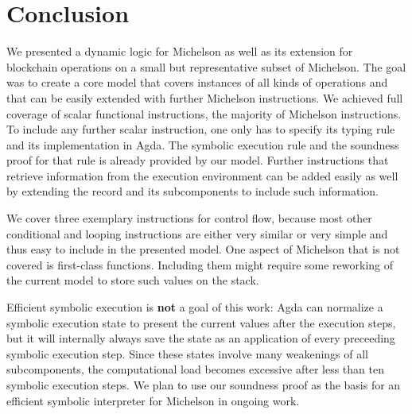 


\section{Conclusion}

We presented a dynamic logic for Michelson as well as its extension for blockchain operations
on a small but representative subset of Michelson.
The goal was to create a core model that covers instances of all kinds
of operations and that can be easily extended with further Michelson instructions.
We achieved full coverage of scalar functional instructions, the majority of Michelson
instructions.
To include any further scalar instruction,
one only has to specify its typing rule and its implementation in Agda.
The symbolic execution rule and the soundness proof for that rule is
already provided by our model.
Further instructions that retrieve information from the execution environment can be added
easily as well by extending the  record and its subcomponents
to include such information.

We cover three exemplary instructions for control flow,
because most other conditional and looping instructions
are either very similar or very simple and thus easy to include in the presented model.
One aspect of Michelson that is not covered is first-class functions.
Including them might require some reworking of the current model to store such values on the stack.

Efficient symbolic execution is \textbf{not} a goal of this work:
Agda can normalize a symbolic execution state to present the current values after the execution 
steps, but it will internally always save the state as an application of every preceeding
symbolic execution step.
Since these states involve many weakenings of all subcomponents,
the computational load becomes excessive after
less than ten symbolic execution steps.
We plan to use our soundness proof as the basis for an efficient
symbolic interpreter for Michelson in ongoing work.


